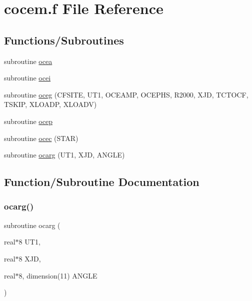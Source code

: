 \hypertarget{cocem_8f}{}\section{cocem.\+f File Reference}
\label{cocem_8f}
\subsection*{Functions/\+Subroutines}
\begin{DoxyCompactItemize}
\item 
subroutine \hyperlink{cocem_8f_ad27f5f74f277b21b214051741c9153b8}{ocea}
\item 
subroutine \hyperlink{cocem_8f_aed92fd2616eadf325988953474a7bf01}{ocei}
\item 
subroutine \hyperlink{cocem_8f_ad3abe403ce2db9218178965a1a37fd08}{oceg} (C\+F\+S\+I\+TE, U\+T1, O\+C\+E\+A\+MP, O\+C\+E\+P\+HS, R2000, X\+JD, T\+C\+T\+O\+CF, T\+S\+K\+IP, X\+L\+O\+A\+DP, X\+L\+O\+A\+DV)
\item 
subroutine \hyperlink{cocem_8f_a007bf5973b6afe4ae1f1523d2af38927}{ocep}
\item 
subroutine \hyperlink{cocem_8f_ab7ac33bca850390c04cef9c971b3aa2a}{ocec} (S\+T\+AR)
\item 
subroutine \hyperlink{cocem_8f_ab760d480a6657b95692a39c68673cbcc}{ocarg} (U\+T1, X\+JD, A\+N\+G\+LE)
\end{DoxyCompactItemize}


\subsection{Function/\+Subroutine Documentation}
\mbox{\label{cocem_8f_ab760d480a6657b95692a39c68673cbcc}} 
\subsubsection{\texorpdfstring{ocarg()}{ocarg()}}
{\footnotesize\ttfamily subroutine ocarg (\begin{DoxyParamCaption}\item[{real$\ast$8}]{U\+T1,  }\item[{real$\ast$8}]{X\+JD,  }\item[{real$\ast$8, dimension(11)}]{A\+N\+G\+LE }\end{DoxyParamCaption})}



